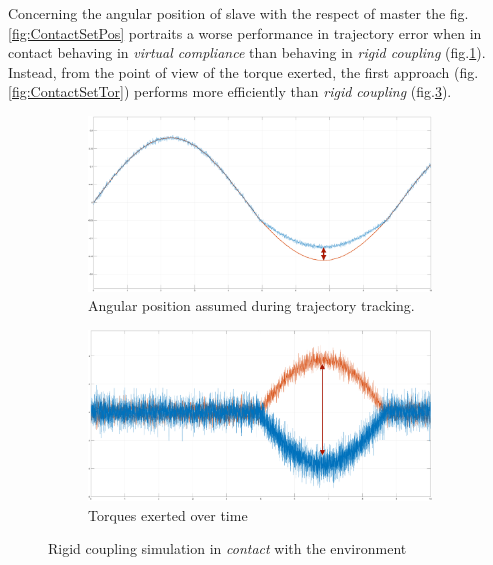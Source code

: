 Concerning the angular position of slave with the respect of master the
fig.\ref{fig:ContactSetPos} portraits a worse performance in trajectory error
when in contact behaving in \textsl{virtual compliance} than behaving in
\textsl{rigid coupling} (fig.\ref{fig:ContactRigPos}).
\newline
Instead, from the point of view of the torque exerted, the first approach
(fig.\ref{fig:ContactSetTor}) performs more efficiently than \textsl{rigid
  coupling} (fig.\ref{fig:ContactRigTor}).

  
\begin{figure}[h]
	\begin{subfigure}[h!]{1\linewidth}
		\centering
		\includegraphics[width=\textwidth, height=0.45\textwidth]{Images/rigidContactReacPosArrow}
		\caption{ Angular position assumed during trajectory tracking.}
		\label{fig:ContactRigPos}
	\end{subfigure}	
  \newline
	\begin{subfigure}[h!]{1\linewidth}
		\centering
		\includegraphics[width=\textwidth, height=0.45\textwidth]{Images/rigidContactReacTorArrow}
		\caption{ Torques exerted over time}
		\label{fig:ContactRigTor}
	\end{subfigure}	
  \caption{ Rigid coupling simulation in \textsl{contact} with
    the environment}
\end{figure}

